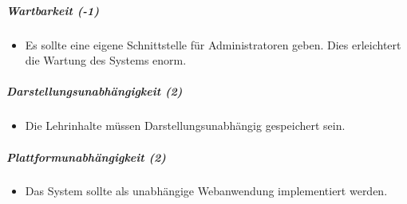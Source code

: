 \documentclass[12pt,a4paper]{article}
\begin{document}
\subparagraph{Wartbarkeit (-1)}
\begin{itemize}
\item Es sollte eine eigene Schnittstelle für Administratoren geben. Dies erleichtert die Wartung des Systems enorm.
\end{itemize}
\subparagraph{Darstellungsunabhängigkeit (2)}
\begin{itemize}
\item Die Lehrinhalte müssen Darstellungsunabhängig gespeichert sein.
\end{itemize}
\subparagraph{Plattformunabhängigkeit (2)}
\begin{itemize}
\item Das System sollte als unabhängige Webanwendung implementiert werden.
\end{itemize}
\end{document}
